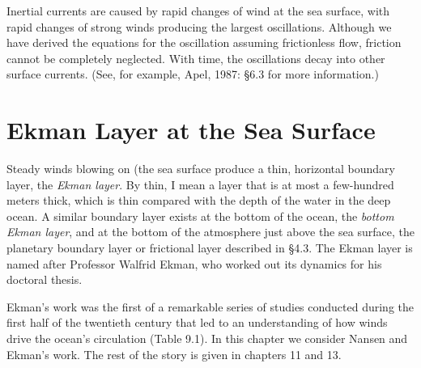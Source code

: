 Inertial currents are caused by rapid changes of wind at the sea surface, with
rapid changes of strong winds producing the largest oscillations. Although we
have derived the equations for the oscillation assuming frictionless flow, friction
cannot be completely neglected. With time, the oscillations decay into other surface
currents. (See, for example, Apel, 1987: \S6.3 for more information.)

\section{Ekman Layer at the Sea Surface}
Steady winds blowing on (the sea
surface produce a thin, horizontal boundary layer, the
\textit{Ekman layer}.  By thin, I mean a layer
that is at most a few-hundred meters thick, which is thin compared with the depth of
the water in the deep ocean. A similar boundary layer exists at the bottom of the
ocean, the
\textit{bottom Ekman layer}, and at the bottom of the
atmosphere just above the sea surface, the planetary boundary layer or frictional
layer described in \S 4.3. The Ekman layer is named after Professor Walfrid Ekman, who
worked out its dynamics for his doctoral thesis.

Ekman's work was the first of a remarkable series of studies conducted during the
first half of the twentieth century that led to an understanding of how winds
drive the ocean's circulation (Table 9.1). In this chapter we consider Nansen and
Ekman's work. The rest of the story is given in chapters 11 and 13.

